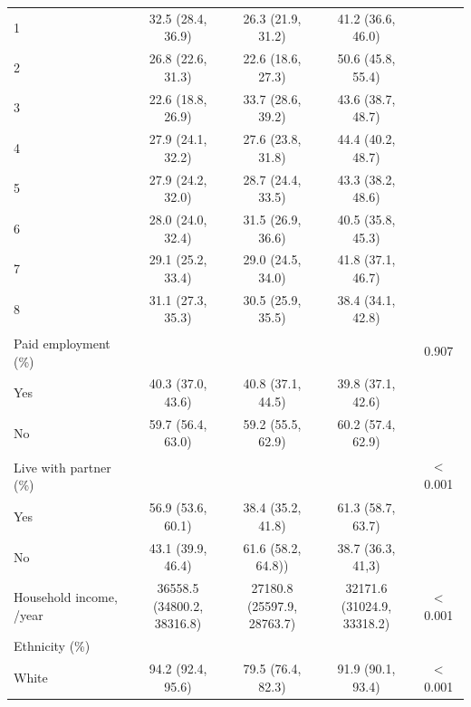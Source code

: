 \begin{table}[H]
\begin{tabular}[t]{lcccc}
	\hspace{1em}1 & 32.5 (28.4, 36.9) & 26.3 (21.9, 31.2) & 41.2 (36.6, 46.0) & \\
	\hspace{1em}2 & 26.8 (22.6, 31.3) & 22.6 (18.6, 27.3) & 50.6 (45.8, 55.4) & \\
	\hspace{1em}3 & 22.6 (18.8, 26.9) & 33.7 (28.6, 39.2) & 43.6 (38.7, 48.7) & \\
	\hspace{1em}4 & 27.9 (24.1, 32.2) & 27.6 (23.8, 31.8) & 44.4 (40.2, 48.7) & \\
	\hspace{1em}5 & 27.9 (24.2, 32.0) & 28.7 (24.4, 33.5) & 43.3 (38.2, 48.6) & \\
	\hspace{1em}6 & 28.0 (24.0, 32.4) & 31.5 (26.9, 36.6) & 40.5 (35.8, 45.3) & \\
	\hspace{1em}7 & 29.1 (25.2, 33.4) & 29.0 (24.5, 34.0) & 41.8 (37.1, 46.7) & \\
	\hspace{1em}8 & 31.1 (27.3, 35.3) & 30.5 (25.9, 35.5) & 38.4 (34.1, 42.8) & \\
	Paid employment\textsuperscript{\dag} (\%) &  &  &  & 0.907\\
	\hspace{1em}Yes & 40.3 (37.0, 43.6) & 40.8 (37.1, 44.5) & 39.8 (37.1, 42.6) & \\
	\hspace{1em}No & 59.7 (56.4, 63.0) & 59.2 (55.5, 62.9) & 60.2 (57.4, 62.9) & \\
	Live with partner\textsuperscript{\ddag} (\%) &  &  &  & < 0.001\\
	\hspace{1em}Yes & 56.9 (53.6, 60.1) & 38.4 (35.2, 41.8) & 61.3 (58.7, 63.7) & \\
	\hspace{1em}No & 43.1 (39.9, 46.4) & 61.6 (58.2, 64.8)) & 38.7 (36.3, 41,3) & \\
	Household income, \textsterling/year & \Centerstack{36558.5\\(34800.2, 38316.8)} & \Centerstack{27180.8\\(25597.9, 28763.7)} & \Centerstack{32171.6\\(31024.9, 33318.2)} & < 0.001\\
	Ethnicity (\%) &  &  &  & \\
	\hspace{1em}White & 94.2 (92.4, 95.6) & 79.5 (76.4, 82.3) & 91.9 (90.1, 93.4) & < 0.001\\

\end{tabular}
\end{table}
